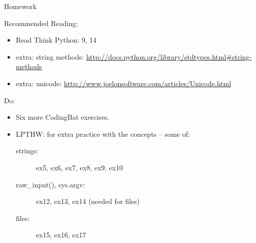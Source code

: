 \documentclass{beamer}
\begin{document}
\begin{frame}[fragile]{Homework}

Recommended Reading:
\begin{itemize}
  \item Read Think Python: 9, 14
  \item extra: string methods: \url{http://docs.python.org/library/stdtypes.html#string-methods}
  \item extra: unicode: \url{http://www.joelonsoftware.com/articles/Unicode.html}
\end{itemize}

Do:
\begin{itemize}
    \item Six more CodingBat exercises. 
    \item LPTHW: for extra practice with the concepts -- some of:
    \begin{description}
        \item[strings:] ex5, ex6, ex7, ex8, ex9, ex10
        \item[raw\_input(), sys.argv:] ex12, ex13, ex14 (needed for files)
        \item[files:] ex15, ex16, ex17 
    \end{description}    
\end{itemize}

\end{frame}
\end{document}
